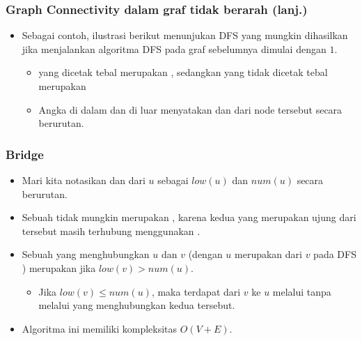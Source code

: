 \begin{frame}
\frametitle{Graph Connectivity dalam graf tidak berarah (lanj.)}
\begin{itemize}
  \item Sebagai contoh, ilustrasi berikut menunjukan DFS \ftree yang mungkin dihasilkan jika menjalankan algoritma DFS pada graf sebelumnya dimulai dengan \fnode $1$.
  \begin{itemize}
    \item \fedge yang dicetak tebal merupakan \ftreeedge, sedangkan yang tidak dicetak tebal merupakan \fbackedge
    \item Angka di dalam dan di luar \fnode menyatakan \fdiscoverytime dan \flowlink dari node tersebut secara berurutan.
  \end{itemize}
\end{itemize}
\begin{figure}[!h]
\centering
\end{figure}
\end{frame}

\begin{frame}
\frametitle{Bridge}
\begin{itemize}
  \item Mari kita notasikan \fdiscoverytime dan \flowlink dari \fnode $u$ sebagai $low(u)$ dan $num(u)$ secara berurutan.
  \item Sebuah \fbackedge tidak mungkin merupakan \fbridge, karena kedua \fnode yang merupakan ujung dari \fedge tersebut masih terhubung menggunakan \ftreeedge.
  \item Sebuah \ftreeedge yang menghubungkan \fnode $u$ dan $v$ (dengan \fnode $u$ merupakan \fparent dari \fnode $v$ pada DFS \ftree) merupakan \fbridge jika $low(v) > num(u)$.
  \begin{itemize}
    \item Jika $low(v) \le num(u)$, maka terdapat \fpath dari \fnode $v$ ke \fnode $u$ melalui \fbackedge tanpa melalui \fedge yang menghubungkan kedua \fnode tersebut.
  \end{itemize}
  \item Algoritma ini memiliki kompleksitas $O(V + E)$.
\end{itemize}
\end{frame}

